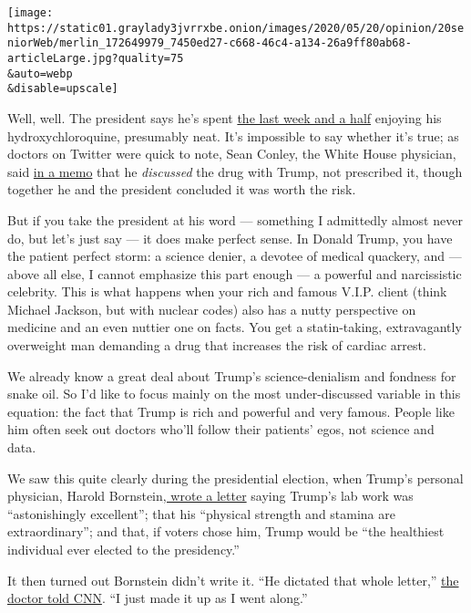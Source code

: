 \texttt{[image: https://static01.graylady3jvrrxbe.onion/images/2020/05/20/opinion/20seniorWeb/merlin\_172649979\_7450ed27-c668-46c4-a134-26a9ff80ab68-articleLarge.jpg?quality=75\\\&auto=webp\\\&disable=upscale]}

Well, well. The president says he's spent
\href{https://www.nytimes3xbfgragh.onion/2020/05/18/us/politics/trump-hydroxychloroquine-covid-coronavirus.html}{the
last week and a half} enjoying his hydroxychloroquine, presumably neat.
It's impossible to say whether it's true; as doctors on Twitter were
quick to note, Sean Conley, the White House physician, said
\href{https://int.graylady3jvrrxbe.onion/data/documenthelper/6959-letter-from-white-house-physic/e3e29d81b7d6339b9f56/optimized/full.pdf\#page=1}{in
a memo} that he \emph{discussed} the drug with Trump, not prescribed it,
though together he and the president concluded it was worth the risk.

But if you take the president at his word --- something I admittedly
almost never do, but let's just say --- it does make perfect sense. In
Donald Trump, you have the patient perfect storm: a science denier, a
devotee of medical quackery, and --- above all else, I cannot emphasize
this part enough --- a powerful and narcissistic celebrity. This is what
happens when your rich and famous V.I.P. client (think Michael Jackson,
but with nuclear codes) also has a nutty perspective on medicine and an
even nuttier one on facts. You get a statin-taking, extravagantly
overweight man demanding a drug that increases the risk of cardiac
arrest.

We already know a great deal about Trump's science-denialism and
fondness for snake oil. So I'd like to focus mainly on the most
under-discussed variable in this equation: the fact that Trump is rich
and powerful and very famous. People like him often seek out doctors
who'll follow their patients' egos, not science and data.

We saw this quite clearly during the presidential election, when Trump's
personal physician, Harold
Bornstein\href{https://www.npr.org/sections/thetwo-way/2018/05/02/607638733/doctor-trump-dictated-letter-attesting-to-his-extraordinary-health}{,
wrote a letter} saying Trump's lab work was ``astonishingly excellent'';
that his ``physical strength and stamina are extraordinary''; and that,
if voters chose him, Trump would be ``the healthiest individual ever
elected to the presidency.''

It then turned out Bornstein didn't write it. ``He dictated that whole
letter,''
\href{https://www.cnn.com/2018/05/01/politics/harold-bornstein-trump-letter/index.html}{the
doctor told CNN}. ``I just made it up as I went along.''


